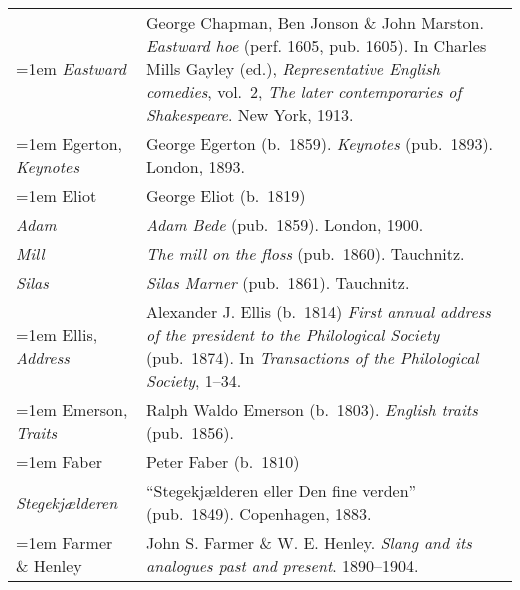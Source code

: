 \begin{xltabular}{\textwidth}{ lQ }
\hangindent=1em  \textit{Eastward} & George Chapman, Ben Jonson \& John Marston. \textit{Eastward hoe} (perf. 1605, pub. 1605). In Charles Mills Gayley (ed.), \textit{Representative English comedies}, vol.~2, \textit{The later contemporaries of Shakespeare}. New York, 1913. \\ %

\hangindent=1em  Egerton, \textit{Keynotes} & George Egerton (b.~1859). \textit{Keynotes} (pub.~1893). London, 1893. \\ 

\hangindent=1em  Eliot & George Eliot (b.~1819) \\
\hspace{1em}\textit{Adam} & \textit{Adam Bede} (pub.~1859). London, 1900. \\
\hspace{1em}\textit{Mill} & \textit{The mill on the floss} (pub.~1860). Tauchnitz. \\
\hspace{1em}\textit{Silas} & \textit{Silas Marner} (pub.~1861). Tauchnitz. \\


\hangindent=1em  Ellis, \textit{Address} & Alexander J. Ellis (b.~1814) \textit{First annual address of the president to the Philological Society} (pub.~1874). In \textit{Transactions of the Philological Society}, 1--34.\\


\hangindent=1em  Emerson, \textit{Traits} & Ralph Waldo Emerson (b.~1803). \textit{English traits} (pub.~1856). \\

\hangindent=1em  Faber & Peter Faber (b.~1810)\\
\hspace{1em}\textit{Stegekjælderen} &  ``Stegekjælderen eller Den fine verden'' (pub.~1849). Copenhagen, 1883. \\ %

\hangindent=1em  Farmer \& Henley & John S. Farmer \& W. E. Henley. \textit{Slang and its analogues past and present}. 1890–1904. \\ %


\end{xltabular}
